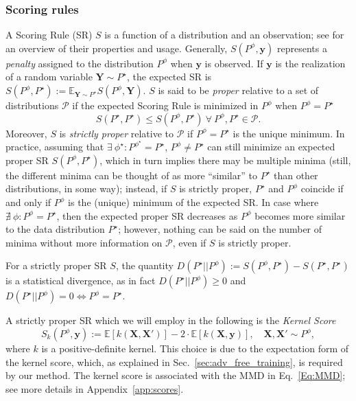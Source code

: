\documentclass[twoside,11pt]{article}
\newcommand{\E}{\mathbb{E}}
\newcommand{\ddobs}{\mathbf{y}}
\newcommand{\Ddsim}{\mathbf{X}}
\newcommand{\Ddobs}{\mathbf{Y}}
\begin{document}
	
	\subsubsection{Scoring rules}
	
	
	A Scoring Rule (SR) $ S $ is a function of a distribution and an observation; see \cite{gneiting2007strictly, dawid2014theory} for an overview of their properties and usage. Generally, $ S(P^\phi, \ddobs) $ represents a \textit{penalty} assigned to the distribution $ P^\phi $ when $ \ddobs $ is observed. If $\ddobs$ is the realization of a random variable $ \Ddobs \sim P^\star $, the expected SR is
	$ S(P^\phi,P^\star) := \E_{\Ddobs \sim P^\star} S(P^\phi, \Ddobs).$
	$ S $ is said to be \textit{proper} relative to a set of distributions $ \mathcal{P}$ if the expected Scoring Rule is minimized in $ P^\phi $ when $ P^\phi=P^\star $ $$ S(P^\star, P^\star) \le S(P^\phi,P^\star) \ \forall \ P^\phi,P^\star \in \mathcal{P}.$$ Moreover, $ S $ is \textit{strictly proper} relative to $ \mathcal{P} $ if $ P^\phi = P^\star $ is the unique minimum. 
	In practice, assuming that $ \exists\ \phi^\star  : P^{\phi^\star} = P^\star $, $ P^\phi \neq P^\star $ can still minimize an expected proper SR $ S(P^\phi,P^\star) $, which in turn implies there may be multiple minima (still, the different minima can be thought of as more ``similar'' to $P^\star$ than other distributions, in some way); instead, if $ S $ is strictly proper, $ P^\star $ and $ P^\phi $ coincide if and only if $ P^\phi $ is the (unique) minimum of the expected SR. In case where $ \nexists \ \phi : P^\phi = P^\star$, then the expected proper SR  decreases as $ P^{\phi} $ becomes more similar to the data distribution $ P^\star $; however, nothing can be said on the number of minima without more information on $ \mathcal P $, even if $ S $ is strictly proper.
	
	
	For a strictly proper SR $ S $, the quantity $ D(P^\star||P^\phi) := S(P^\phi,P^\star) - S(P^\star,P^\star) $
	is a statistical divergence, as in fact $  D(P^\star||P^\phi)\ge 0 $ and
	$ D(P^\star||P^\phi) = 0 \iff P^\phi=P^\star $.
	
	A strictly proper SR which we will employ in the following is the \textit{Kernel Score} \citep{gneiting2007strictly}\begin{equation}\label{Eq:kernel_score}
	S_k(P^\phi, \ddobs) := \E[k(\Ddsim,\Ddsim')] - 2\cdot\E [k(\Ddsim, \ddobs)], \quad  \Ddsim,  \Ddsim' \sim P^\phi,
	\end{equation}
	where $ k $ is a positive-definite kernel. This choice is due to the expectation form of the kernel score, which, as explained in Sec.~\ref{sec:adv_free_training}, is required by our method. The kernel score is associated with the MMD in Eq.~\eqref{Eq:MMD}; see more details in Appendix~\ref{app:scores}.
	
\end{document}
